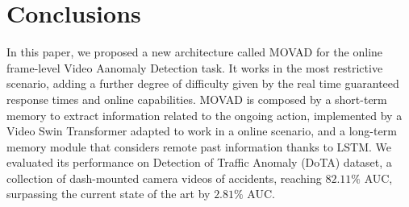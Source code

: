 \section{Conclusions}
\label{sec:conclusions}

In this paper, we proposed a new architecture called MOVAD for the online frame-level Video Aanomaly Detection task.
It works in the most restrictive scenario, adding a further degree of difficulty given by the real time guaranteed response times and online capabilities.
MOVAD is composed by a short-term memory to extract information related to the ongoing action, implemented by a Video Swin Transformer adapted to work in a online scenario, and a long-term memory module that considers remote past information thanks to LSTM.
We evaluated its performance on Detection of Traffic Anomaly (DoTA) dataset, a collection of dash-mounted camera videos of accidents, reaching $82.11\%$ AUC, surpassing the current state of the art by $2.81\%$ AUC.